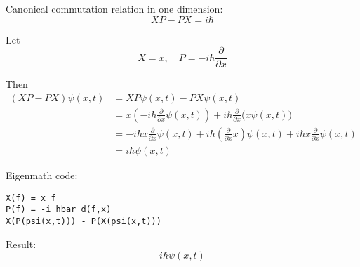 

\iffalse
Fedak  and Prentis write
\begin{quote}
The theory of Fourier and the correspondence principle of Bohr
played a vital role in Heisenberg's development of quantum mechanics.
\end{quote}

Aitchison, MacManus, and Snyder write
\begin{quote}
This `difficulty’ clearly unsettled Heisenberg: but it very
quickly became clear that the non-commutativity (in general) of kinematical
quantities in quantum theory was the really essential new technical idea in the
paper.
\end{quote}
\fi

Canonical commutation relation in one dimension:
\begin{equation*}
XP-PX=i\hbar
\end{equation*}

Let
\begin{equation*}
X=x,\quad P=-i\hbar\frac{\partial}{\partial x}
\end{equation*}

Then
\begin{align*}
(XP-PX)\psi(x,t)&=XP\psi(x,t)-PX\psi(x,t)
\\
&=x\left(-i\hbar\frac{\partial}{\partial x}\psi(x,t)\right)
+i\hbar\frac{\partial}{\partial x}\bigl(x\psi(x,t)\bigr)
\\
&=-i\hbar x\frac{\partial}{\partial x}\psi(x,t)
+i\hbar\left(\frac{\partial}{\partial x}x\right)\psi(x,t)
+i\hbar x\frac{\partial}{\partial x}\psi(x,t)
\\
&=i\hbar\psi(x,t)
\end{align*}

Eigenmath code:
\begin{verbatim}
X(f) = x f
P(f) = -i hbar d(f,x)
X(P(psi(x,t))) - P(X(psi(x,t)))
\end{verbatim}

Result:
\begin{equation*}
i\hbar\psi(x,t)
\end{equation*}

\iffalse
Commutation relation in three dimensions.
\begin{equation*}
X_1P_1-P_1X_1=i\hbar,\quad
X_2P_2-P_2X_2=i\hbar,\quad
X_3P_3-P_3X_3=i\hbar
\end{equation*}

and
\begin{equation*}
X_jP_k-P_kX_j=0,\quad j\ne k
\end{equation*}
\fi


